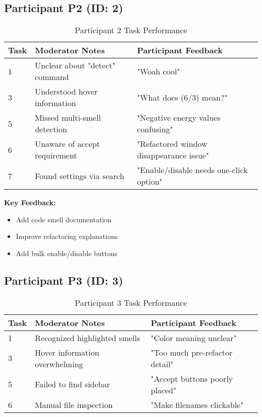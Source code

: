 \documentclass{article}
\begin{document}
\subsection{Participant P2 (ID: 2)}
\begin{table}[H]
\centering
\caption{Participant 2 Task Performance}
\begin{tabular}{|l|p{4cm}|p{4cm}|}
\hline
\textbf{Task} & \textbf{Moderator Notes} & \textbf{Participant Feedback} \\ \hline
1 & Unclear about "detect" command & "Woah cool" \\ \hline
3 & Understood hover information & "What does (6/3) mean?" \\ \hline
5 & Missed multi-smell detection & "Negative energy values confusing" \\ \hline
6 & Unaware of accept requirement & "Refactored window disappearance issue" \\ \hline
7 & Found settings via search & "Enable/disable needs one-click option" \\ \hline
\end{tabular}
\end{table}

\textbf{Key Feedback:}
\begin{itemize}
\item Add code smell documentation
\item Improve refactoring explanations
\item Add bulk enable/disable buttons
\end{itemize}

\subsection{Participant P3 (ID: 3)}
\begin{table}[H]
\centering
\caption{Participant 3 Task Performance}
\begin{tabular}{|l|p{4cm}|p{4cm}|}
\hline
\textbf{Task} & \textbf{Moderator Notes} & \textbf{Participant Feedback} \\ \hline
1 & Recognized highlighted smells & "Color meaning unclear" \\ \hline
3 & Hover information overwhelming & "Too much pre-refactor detail" \\ \hline
5 & Failed to find sidebar & "Accept buttons poorly placed" \\ \hline
6 & Manual file inspection & "Make filenames clickable" \\ \hline
\end{tabular}
\end{table}
\end{document}
